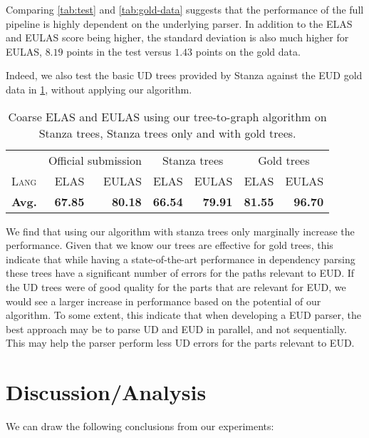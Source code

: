\documentclass[11pt,a4paper]{article}
\begin{document}
Comparing \cref{tab:test} and \cref{tab:gold-data} suggests that
the performance of the full pipeline is highly dependent on the
underlying parser. In addition to the ELAS and EULAS score being
higher, the standard deviation is also much higher for EULAS,
$8.19$ points in the test versus $1.43$ points on the gold data.

Indeed, we also test the basic UD trees provided by Stanza against
the EUD gold data in \cref{tab:test_stanza}, without applying our
algorithm.

\begin{table}[h]
    \centering
    \tiny
    \begin{tabular}{l|rr|rr|rr}
        & \multicolumn{2}{c}{Official submission} & \multicolumn{2}{c}{Stanza trees} & \multicolumn{2}{c}{Gold trees} \\
        \textsc{Lang} & \textsc{ELAS} & \textsc{EULAS} & \textsc{ELAS} & \textsc{EULAS}& \textsc{ELAS} & \textsc{EULAS}\\
        \hline
        \textbf{Avg.} & \textbf{67.85} & \textbf{80.18} & \textbf{66.54} & \textbf{79.91} & \textbf{81.55} & \textbf{96.70} \\
    \end{tabular}
    \caption{\label{tab:test_stanza} Coarse ELAS and EULAS using our tree-to-graph algorithm on Stanza trees, Stanza trees only and with gold trees.}
\end{table}

We find that using our algorithm with stanza trees only marginally
increase the performance.
%
Given that we know our trees are effective for gold trees, this
indicate that while having a state-of-the-art performance in
dependency parsing these trees have a significant number of
errors for the paths relevant to EUD. If the UD trees were of
good quality for the parts that are relevant for EUD, we would
see a larger increase in performance based on the potential of
our algorithm. To some extent, this indicate that when developing
a EUD parser, the best approach may be to parse UD and EUD in
parallel, and not sequentially. This may help the parser perform
less UD errors for the parts relevant to EUD.

   
\section{Discussion/Analysis}
    
We can draw the following conclusions from our experiments:
\end{document}
